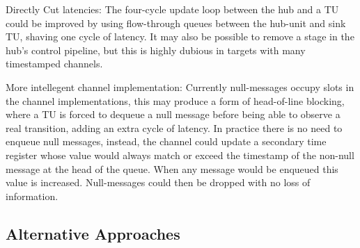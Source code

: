 Directly Cut latencies: The four-cycle update loop between the hub and a TU could be
improved by using flow-through queues between the hub-unit and sink TU, shaving
one cycle of latency. It may also be possible to remove a stage in the hub's
control pipeline, but this is highly dubious in targets with many timestamped
channels.

More intellegent channel implementation: Currently null-messages occupy slots
in the channel implementations, this may produce a form of head-of-line
blocking, where a TU is forced to dequeue a null message before being able to
observe a real transition, adding an extra cycle of latency. In practice there
is no need to enqueue null messages, instead, the channel could update a
secondary time register whose value would always match or exceed the timestamp
of the non-null message at the head of the queue. When any message would be
enqueued this value is increased. Null-messages could then be dropped with no loss of information.

\subsection{Alternative Approaches}





%
